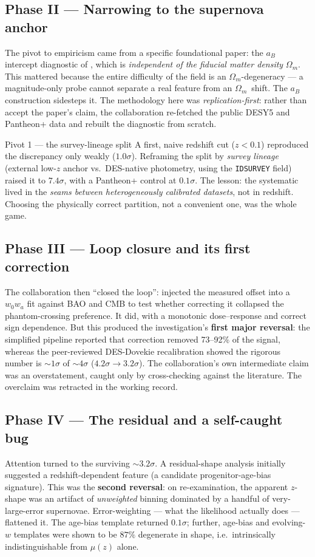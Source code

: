 \documentclass[11pt]{article}
\newcommand{\Om}{\ensuremath{\Omega_m}}
\newcommand{\wo}{\ensuremath{w_0}}
\newcommand{\wa}{\ensuremath{w_a}}
\begin{document}
\subsection{Phase II --- Narrowing to the supernova anchor}
The pivot to empiricism came from a specific foundational paper: the $a_B$ intercept diagnostic of \citet{huang}, which is \emph{independent of the fiducial matter density} \Om. This mattered because the entire difficulty of the field is an \Om-degeneracy --- a magnitude-only probe cannot separate a real feature from an \Om\ shift. The $a_B$ construction sidesteps it. The methodology here was \emph{replication-first}: rather than accept the paper's claim, the collaboration re-fetched the public DESY5 and Pantheon+ data and rebuilt the diagnostic from scratch.

\begin{keybox}{Pivot 1 --- the survey-lineage split}
A first, naive redshift cut ($z<0.1$) reproduced the discrepancy only weakly ($1.0\sigma$). Reframing the split by \emph{survey lineage} (external low-$z$ anchor vs.\ DES-native photometry, using the \texttt{IDSURVEY} field) raised it to $7.4\sigma$, with a Pantheon+ control at $0.1\sigma$. The lesson: the systematic lived in the \emph{seams between heterogeneously calibrated datasets}, not in redshift. Choosing the physically correct partition, not a convenient one, was the whole game.
\end{keybox}

\subsection{Phase III --- Loop closure and its first correction}
The collaboration then ``closed the loop'': injected the measured offset into a $\wo\wa$ fit against BAO and CMB to test whether correcting it collapsed the phantom-crossing preference. It did, with a monotonic dose--response and correct sign dependence. But this produced the investigation's \textbf{first major reversal}: the simplified pipeline reported that correction removed 73--92\% of the signal, whereas the peer-reviewed DES-Dovekie recalibration \citep{dovekie,dovekiecal} showed the rigorous number is $\sim\!1\sigma$ of $\sim\!4\sigma$ ($4.2\sigma\to3.2\sigma$). The collaboration's own intermediate claim was an overstatement, caught only by cross-checking against the literature. The overclaim was retracted in the working record.

\subsection{Phase IV --- The residual and a self-caught bug}
Attention turned to the surviving $\sim\!3.2\sigma$. A residual-shape analysis initially suggested a redshift-dependent feature (a candidate progenitor-age-bias signature). This was the \textbf{second reversal}: on re-examination, the apparent $z$-shape was an artifact of \emph{unweighted} binning dominated by a handful of very-large-error supernovae. Error-weighting --- what the likelihood actually does --- flattened it. The age-bias template returned $0.1\sigma$; further, age-bias and evolving-$w$ templates were shown to be $87\%$ degenerate in shape, i.e.\ intrinsically indistinguishable from $\mu(z)$ alone.
\end{document}
